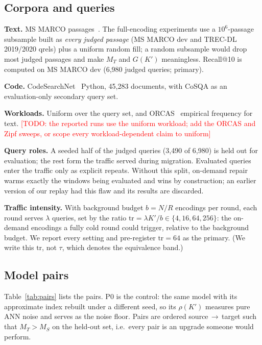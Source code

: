 \documentclass[conference]{IEEEtran}
\newcommand{\todo}[1]{\textcolor{red}{[TODO: #1]}}
\begin{document}
\subsection{Corpora and queries}
\textbf{Text.} MS MARCO passages~\cite{msmarco}. The full-encoding experiments use a
$10^6$-passage subsample built as \emph{every judged passage} (MS MARCO dev and TREC-DL
2019/2020 qrels) plus a uniform random fill; a random subsample would drop most judged
passages and make $M_T$ and $G(K')$ meaningless. Recall@10 is computed on MS MARCO dev
(6{,}980 judged queries; primary).

\textbf{Code.} CodeSearchNet~\cite{codesearchnet} Python, 45{,}283 documents, with CoSQA
as an evaluation-only secondary query set.

\textbf{Workloads.} Uniform over the query set, and ORCAS~\cite{orcas} empirical
frequency for text. \todo{the reported runs use the uniform workload; add the ORCAS
and Zipf sweeps, or scope every workload-dependent claim to uniform}

\textbf{Query roles.} A seeded half of the judged queries (3{,}490 of 6{,}980) is held
out for evaluation; the rest form the traffic served during migration. Evaluated queries
enter the traffic only as explicit repeats. Without this split, on-demand repair warms
exactly the windows being evaluated and wins by construction; an earlier version of our
replay had this flaw and its results are discarded.

\textbf{Traffic intensity.} With background budget $b = N/R$ encodings per round, each
round serves $\lambda$ queries, set by the ratio $\mathrm{tr} = \lambda K'/b \in \{4, 16,
64, 256\}$: the on-demand encodings a fully cold round could trigger, relative to the
background budget. We report every setting and pre-register $\mathrm{tr}{=}64$ as the
primary. (We write this $\mathrm{tr}$, not $\tau$, which denotes the equivalence band.)

\subsection{Model pairs}
Table~\ref{tab:pairs} lists the pairs. P0 is the control: the same model with its
approximate index rebuilt under a different seed, so its $\rho(K')$ measures pure ANN
noise and serves as the noise floor. Pairs are ordered source\,$\to$\,target such that
$M_T > M_S$ on the held-out set, i.e.\ every pair is an upgrade someone would perform.
\end{document}
